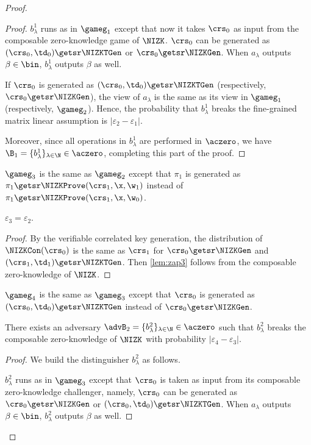 \begin{proof}
\begin{proof}
$b_\lambda^1$ runs as in $\gameg_1$ except that now it takes $\crs_0$ as input from the composable zero-knowledge game of $\NIZK$. $\crs_0$ can be generated as $(\crs_0,\td_0)\getsr\NIZKTGen$ or $\crs_0\getsr\NIZKGen$. When $a_\lambda$ outputs $\beta\in\bin$, $b_\lambda^1$ outputs $\beta$ as well.

If $\crs_0$ is generated as $(\crs_0,\td_0)\getsr\NIZKTGen$ (respectively, $\crs_0\getsr\NIZKGen$), the view of $a_\lambda$ is the same as its view in $\gameg_1$ (respectively, $\gameg_2$). Hence, the probability that $b_\lambda^1$ breaks the fine-grained matrix linear assumption is
$|\varepsilon_2-\varepsilon_1|$.

Moreover, since all operations in $b_\lambda^1$ are performed in $\aczero$, we have $\B_1 = \{b_{\lambda}^1\}_{\lambda\in\N} \in \aczero$, completing this part of the proof.
\end{proof}

$\gameg_3$ is the same as $\gameg_2$ except that $\pi_1$ is generated as $\pi_1\getsr\NIZKProve(\crs_1,\allowbreak\x,\w_1)$ instead of $\pi_1\getsr\NIZKProve(\crs_1,\x,\w_0)$.
\begin{lemma}
\label{lem:zap3}
$\varepsilon_3=\varepsilon_2$.
\end{lemma}
\begin{proof}
By the  verifiable correlated key generation, the distribution of $\NIZKCon(\crs_0)$ is the same as $\crs_1$ for $\crs_0\getsr\NIZKGen$ and $(\crs_1,\td_1)\getsr\NIZKTGen$.
Then \cref{lem:zap3} follows from the composable zero-knowledge of $\NIZK$.
\end{proof}

$\gameg_4$ is the same as $\gameg_3$ except that $\crs_0$ is generated as 
$(\crs_0,\td_0)\getsr\NIZKTGen$ instead of $\crs_0\getsr\NIZKGen$.

\begin{lemma}
\label{lem:zap4}
There exists an adversary $\advB_2=\{b_\lambda^2\}_{\lambda\in\N}\in\aczero$ such that $b_\lambda^2$ breaks the composable zero-knowledge of $\NIZK$ with probability
$|\varepsilon_4-\varepsilon_3|$.
\end{lemma}
\begin{proof}
We build the distinguisher $b_\lambda^2$ as follows. 

$b_\lambda^2$ runs as in $\gameg_3$ except that $\crs_0$ is taken as input from its composable zero-knowledge challenger, namely, $\crs_0$ can be generated as $\crs_0\getsr\NIZKGen$ or $(\crs_0,\td_0)\getsr\NIZKTGen$.
When $a_\lambda$ outputs $\beta\in\bin$, $b_\lambda^2$ outputs $\beta$ as well.


\end{proof}
\end{proof}
